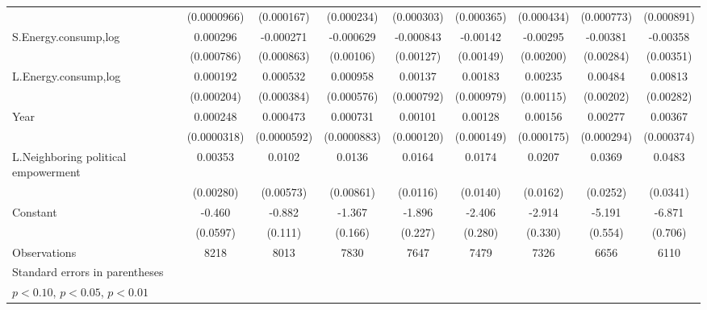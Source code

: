 \begin{table}[htbp]
\begin{tabular}{l*{8}{c}}
                    & (0.0000966)         &  (0.000167)         &  (0.000234)         &  (0.000303)         &  (0.000365)         &  (0.000434)         &  (0.000773)         &  (0.000891)         \\
[1em]
S.Energy.consump,log&    0.000296         &   -0.000271         &   -0.000629         &   -0.000843         &    -0.00142         &    -0.00295         &    -0.00381         &    -0.00358         \\
                    &  (0.000786)         &  (0.000863)         &   (0.00106)         &   (0.00127)         &   (0.00149)         &   (0.00200)         &   (0.00284)         &   (0.00351)         \\
[1em]
L.Energy.consump,log&    0.000192         &    0.000532         &    0.000958\sym{*}  &     0.00137\sym{*}  &     0.00183\sym{*}  &     0.00235\sym{**} &     0.00484\sym{**} &     0.00813\sym{***}\\
                    &  (0.000204)         &  (0.000384)         &  (0.000576)         &  (0.000792)         &  (0.000979)         &   (0.00115)         &   (0.00202)         &   (0.00282)         \\
[1em]
Year                &    0.000248\sym{***}&    0.000473\sym{***}&    0.000731\sym{***}&     0.00101\sym{***}&     0.00128\sym{***}&     0.00156\sym{***}&     0.00277\sym{***}&     0.00367\sym{***}\\
                    & (0.0000318)         & (0.0000592)         & (0.0000883)         &  (0.000120)         &  (0.000149)         &  (0.000175)         &  (0.000294)         &  (0.000374)         \\
[1em]
L.Neighboring political empowerment&     0.00353         &      0.0102\sym{*}  &      0.0136         &      0.0164         &      0.0174         &      0.0207         &      0.0369         &      0.0483         \\
                    &   (0.00280)         &   (0.00573)         &   (0.00861)         &    (0.0116)         &    (0.0140)         &    (0.0162)         &    (0.0252)         &    (0.0341)         \\
[1em]
Constant            &      -0.460\sym{***}&      -0.882\sym{***}&      -1.367\sym{***}&      -1.896\sym{***}&      -2.406\sym{***}&      -2.914\sym{***}&      -5.191\sym{***}&      -6.871\sym{***}\\
                    &    (0.0597)         &     (0.111)         &     (0.166)         &     (0.227)         &     (0.280)         &     (0.330)         &     (0.554)         &     (0.706)         \\
\hline
Observations        &        8218         &        8013         &        7830         &        7647         &        7479         &        7326         &        6656         &        6110         \\
\hline\hline
\multicolumn{9}{l}{\footnotesize Standard errors in parentheses}\\
\multicolumn{9}{l}{\footnotesize \sym{*} \(p<0.10\), \sym{**} \(p<0.05\), \sym{***} \(p<0.01\)}\\
\end{tabular}
\end{table}
